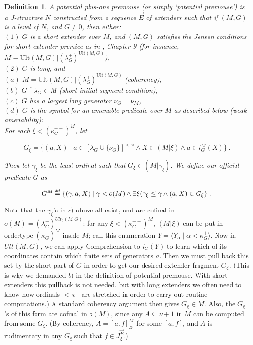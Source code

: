\documentclass[12pt]{article}
\newtheorem{defn}[thm]{Definition}
\newcommand\defeq{\mathrel{\overset{\makebox[0pt]{\mbox{\normalfont\tiny\sffamily def}}}{=}}}
\begin{document}
\begin{defn} \label{ppm}
A potential plus-one premouse (or simply `potential premouse') is a J-structure $N$ constructed from a sequence $\vec{E}$ of extenders such that if $(M, G)$ is a level of $N$, and $G \neq 0$, then either:\\

	$(1)$ $G$ is a short extender over $M$, and $(M, G)$ satisfies the Jensen conditions for short extender premice as in \cite{zeman book}, Chapter 9 (for instance, $M = \text{Ult}(M, G) | (\lambda_G ^+)^{\text{Ult}(M, G)}$),\\
	
	$(2)$ $G$ is long, and\\
	
		\indent \indent $(a)$ $M = \text{Ult}(M, G) | (\lambda_G ^+)^{\text{Ult}(M, G)}$ (\textit{coherency}),\\
		
		\indent \indent $(b)$ $G \restriction \lambda_G \in M$ (\textit{short initial segment condition}),\\
		
		\indent \indent $(c)$ $G$ has a largest long generator $\nu_G = \nu_M$,\\
		
		\indent \indent $(d)$ $\dot{G}$ is the symbol for an amenable predicate over $M$ as described below (\textit{weak amenability}):\\
		
		For each $\xi < (\kappa_G^{++})^M$, let
		
\[
G_\xi = \{ (a, X) \mid a \in [ \lambda_G \cup \{ \nu_G \} ] ^{< \omega} \wedge X \in (M | \xi ) \wedge a \in i_G^M (X) \} \ .
\]
	
	Then let $\gamma_\xi$ be the least ordinal such that $G_\xi \in (M | \gamma_\xi )$.   We define our official predicate $\dot{G}$ as

\[
\dot{G}^M \defeq \{ (\gamma , a, X) \mid \gamma < o(M) \wedge \exists \xi ( \gamma_\xi \leq \gamma \wedge (a, X) \in G_\xi \} \ .
\]

\end{defn}

	
Note that the $\gamma_\xi $'s in $c)$ above all exist, and are cofinal in $o(M) = ( \lambda_G^+ )^{Ult_0 (M, G) }$: for any $\xi < (\kappa_G^{++})^M$, $(M | \xi)$ can be put in ordertype $(\kappa_G^+)^M$ inside $M$; call this enumeration $Y = \langle Y_\alpha \mid \alpha < \kappa_G^+ \rangle$.  Now in $Ult(M, G)$, we can apply Comprehension to $i_G (Y)$ to learn which of its coordinates contain which finite sets of generators $a$.  Then we must pull back this set by the short part of $G$ in order to get our desired extender-fragment $G_\xi$.  (This is why we demanded $b)$ in the definition of potential premouse.  With short extenders this pullback is not needed, but with long extenders we often need to know how ordinals $< \kappa^+$ are stretched in order to carry out routine computations.)  A standard coherency argument then gives $G_\xi \in M$.  Also, the $G_\xi$'s of this form are cofinal in $o(M)$, since any $A \subseteq \nu + 1$ in $M$ can be computed from some $G_\xi$.  (By coherency, $A = [a, f]_E^M$ for some $[a , f]$, and $A$ is rudimentary in any $G_\xi$ such that $f \in J_\xi^{\vec{E}}$.)
	
\end{document}
